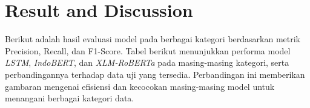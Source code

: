 \documentclass[12pt,a4paper]{article}
\begin{document}
\newpage











\section{Result and Discussion}
\begin{adjustwidth}{3em}{0pt}
\hspace{0.5cm} Berikut adalah hasil evaluasi model pada berbagai kategori berdasarkan metrik Precision, Recall, dan F1-Score. Tabel berikut menunjukkan performa model \textit{LSTM}, \textit{IndoBERT}, dan \textit{XLM-RoBERTa} pada masing-masing kategori, serta perbandingannya terhadap data uji yang tersedia. Perbandingan ini memberikan gambaran mengenai efisiensi dan kecocokan masing-masing model untuk menangani berbagai kategori data.\end{adjustwidth}
\end{document}

